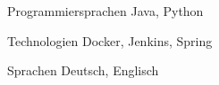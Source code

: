 

\begin{cvskills}

  \cvskill
    {Programmiersprachen} %
    {Java, Python} %

  \cvskill
    {Technologien} %
    {Docker, Jenkins, Spring} %

  \cvskill
    {Sprachen} %
    {Deutsch, Englisch} %

\end{cvskills}
